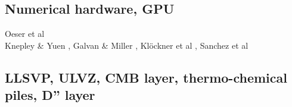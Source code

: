 \subsection{Numerical hardware, GPU}
\label{sec:topics:hardware}

\begin{scriptsize}
Oeser et al \cite{oebm06}\\
Knepley \& Yuen \cite{knyu13}, Galvan \& Miller \cite{gami13}, Kl\"ockner et al \cite{klwh13},
Sanchez et al \cite{sagy13}
\end{scriptsize}

\subsection{LLSVP, ULVZ, CMB layer, thermo-chemical piles, D'' layer}

